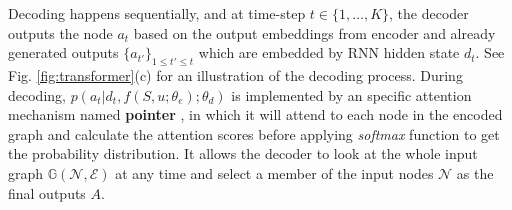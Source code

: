 Decoding happens sequentially, 
and at time-step $t \in \{1,\dots,K\}$, 
the decoder outputs the node $a_t$ based on the output embeddings from encoder
and already generated outputs $\{a_{t'}\}_{1\leq t'\leq t}$ which are embedded by RNN hidden state $d_t$. 
See Fig. \ref{fig:transformer}(c) for an illustration of the decoding process.
During decoding, 
$p(a_t|d_t,f(S,u;\theta_e);\theta_d)$ is implemented by an specific attention mechanism named \textbf{pointer} \cite{vinyals2015pointer},
in which it will attend to each node in the encoded graph 
and calculate the attention scores before applying \emph{softmax} function to get the probability distribution.
It allows the decoder to look at the whole input graph $\mathbb{G}(\mathcal{N},\mathcal{E})$ at any time
and select a member of the input nodes $\mathcal{N}$ as the final outputs $A$. 


